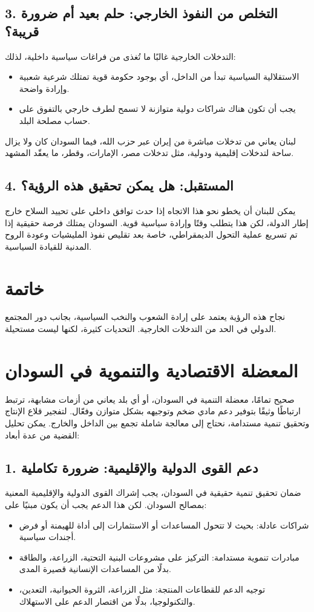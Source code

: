 \documentclass[12pt]{article}
\begin{document}
\subsection*{3. التخلص من النفوذ الخارجي: حلم بعيد أم ضرورة قريبة؟}
التدخلات الخارجية غالبًا ما تُغذى من فراغات سياسية داخلية، لذلك:
\begin{itemize}
    \item الاستقلالية السياسية تبدأ من الداخل، أي بوجود حكومة قوية تمتلك شرعية شعبية وإرادة واضحة.
    \item يجب أن تكون هناك شراكات دولية متوازنة لا تسمح لطرف خارجي بالتفوق على حساب مصلحة البلد.
\end{itemize}

لبنان يعاني من تدخلات مباشرة من إيران عبر حزب الله، فيما السودان كان ولا يزال ساحة لتدخلات إقليمية ودولية، مثل تدخلات مصر، الإمارات، وقطر، ما يعقّد المشهد.

\subsection*{4. المستقبل: هل يمكن تحقيق هذه الرؤية؟}
يمكن للبنان أن يخطو نحو هذا الاتجاه إذا حدث توافق داخلي على تحييد السلاح خارج إطار الدولة، لكن هذا يتطلب وقتًا وإرادة سياسية قوية. السودان يمتلك فرصة حقيقية إذا تم تسريع عملية التحول الديمقراطي، خاصة بعد تقليص نفوذ المليشيات وعودة الروح المدنية للقيادة السياسية. 

\section*{خاتمة}
نجاح هذه الرؤية يعتمد على إرادة الشعوب والنخب السياسية، بجانب دور المجتمع الدولي في الحد من التدخلات الخارجية. التحديات كثيرة، لكنها ليست مستحيلة. 

\section*{المعضلة الاقتصادية والتنموية في السودان}
صحيح تمامًا، معضلة التنمية في السودان، أو أي بلد يعاني من أزمات مشابهة، ترتبط ارتباطًا وثيقًا بتوفير دعم مادي ضخم وتوجيهه بشكل متوازن وفعّال. لتفجير قلاع الإنتاج وتحقيق تنمية مستدامة، نحتاج إلى معالجة شاملة تجمع بين الداخل والخارج. يمكن تحليل القضية من عدة أبعاد:

\subsection*{1. دعم القوى الدولية والإقليمية: ضرورة تكاملية}
ضمان تحقيق تنمية حقيقية في السودان، يجب إشراك القوى الدولية والإقليمية المعنية بمصالح السودان. لكن هذا الدعم يجب أن يكون مبنيًا على:
\begin{itemize}
    \item شراكات عادلة: بحيث لا تتحول المساعدات أو الاستثمارات إلى أداة للهيمنة أو فرض أجندات سياسية.
    \item مبادرات تنموية مستدامة: التركيز على مشروعات البنية التحتية، الزراعة، والطاقة بدلًا من المساعدات الإنسانية قصيرة المدى.
    \item توجيه الدعم للقطاعات المنتجة: مثل الزراعة، الثروة الحيوانية، التعدين، والتكنولوجيا، بدلًا من اقتصار الدعم على الاستهلاك.
\end{itemize}
\end{document}
